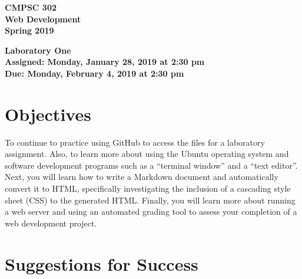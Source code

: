 \documentclass[11pt]{article}
\newcommand{\assignmentduedate}{February 4}
\newcommand{\assignmentassignedate}{January 28}
\newcommand{\assignmentnumber}{One}
\newcommand{\labyear}{2019}
\newcommand{\labday}{Monday}
\newcommand{\labtime}{2:30 pm}
\newcommand{\assigneddate}{Assigned: \labday, \assignmentassignedate, \labyear{} at \labtime{}}
\newcommand{\duedate}{Due: \labday, \assignmentduedate, \labyear{} at \labtime{}}
\newcommand{\labtitle}[1]
{
  \begin{center}
    \begin{center}
      \bf
      CMPSC 302\\Web Development\\
      Spring 2019\\
      \medskip
    \end{center}
    \bf
    #1
  \end{center}
}
\begin{document}
\thispagestyle{empty}

\labtitle{Laboratory \assignmentnumber{} \\ \assigneddate{} \\ \duedate{}}

\section*{Objectives}

To continue to practice using GitHub to access the files for a laboratory
assignment. Also, to learn more about using the Ubuntu operating system and
software development programs such as a ``terminal window'' and a ``text
editor''. Next, you will learn how to write a Markdown document and
automatically convert it to HTML, specifically investigating the inclusion of a
cascading style sheet (CSS) to the generated HTML. Finally, you will learn more
about running a web server and using an automated grading tool to assess your
completion of a web development project.

\section*{Suggestions for Success}
\end{document}
